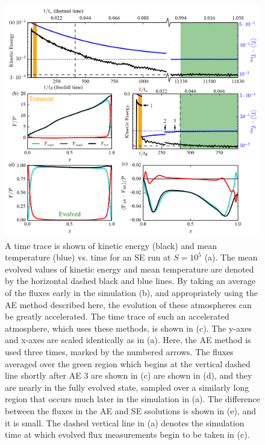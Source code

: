 \documentclass[aps, pre, onecolumn, nofootinbib, notitlepage, groupedaddress, amsfonts, amssymb, amsmath, longbibliography]{revtex4-1}
\begin{document}
\begin{figure}[t]
\includegraphics[width=\textwidth]{./figs/time_trace.png}
\caption{A time trace is shown of kinetic energy (black) and mean temperature (blue)  vs. time 
for an SE run at $S = 10^5$ (a). The mean evolved values of kinetic energy and mean temperature
are denoted by the horizontal dashed black and blue lines. 
By taking an average of the fluxes early in the
simulation (b), and appropriately using the AE method described here, the evolution
of these atmospheres can be greatly accelerated. The time trace of such an accelerated
atmosphere, which uses these methods, is shown in (c).  The y-axes and x-axes are
scaled identically as in (a).  Here, the AE method is used three times, marked by
the numbered arrows. The fluxes averaged over the green region which begins at
the vertical dashed line shortly after AE 3 are shown in (c) are shown
in (d), and they are nearly in the fully evolved state, sampled over a similarly
long region that occurs much later in the simulation in (a).  The difference between
the fluxes in the AE and SE ssolutions is shown in (e), and it is small. The dashed
vertical line in (a) denotes the simulation time at which evolved flux measurements
begin to be taken in (c).
\label{fig:time_trace} }
\end{figure}
\end{document}
